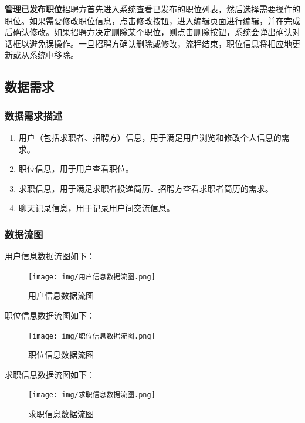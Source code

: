 \documentclass[UTF8,a4paper,10pt]{ctexart}
\begin{document}
\textbf{管理已发布职位}\space 招聘方首先进入系统查看已发布的职位列表，然后选择需要操作的职位。如果需要修改职位信息，点击修改按钮，进入编辑页面进行编辑，并在完成后确认修改。如果招聘方决定删除某个职位，则点击删除按钮，系统会弹出确认对话框以避免误操作。一旦招聘方确认删除或修改，流程结束，职位信息将相应地更新或从系统中移除。

\subsection{数据需求}

\subsubsection{数据需求描述}

\begin{enumerate}
    \item 用户（包括求职者、招聘方）信息，用于满足用户浏览和修改个人信息的需求。
    \item 职位信息，用于用户查看职位。
    \item 求职信息，用于满足求职者投递简历、招聘方查看求职者简历的需求。
    \item 聊天记录信息，用于记录用户间交流信息。
\end{enumerate}

\subsubsection{数据流图}

用户信息数据流图如下：

\begin{figure}[H]
    \centering
    \texttt{[image: img/用户信息数据流图.png]}
    \caption{用户信息数据流图}
    \label{fig:用户信息数据流图}
\end{figure}

职位信息数据流图如下：

\begin{figure}[H]
    \centering
    \texttt{[image: img/职位信息数据流图.png]}
    \caption{职位信息数据流图}
    \label{fig:职位信息数据流图}
\end{figure}

求职信息数据流图如下：

\begin{figure}[H]
    \centering
    \texttt{[image: img/求职信息数据流图.png]}
    \caption{求职信息数据流图}
    \label{fig:求职信息数据流图}
\end{figure}
\end{document}
